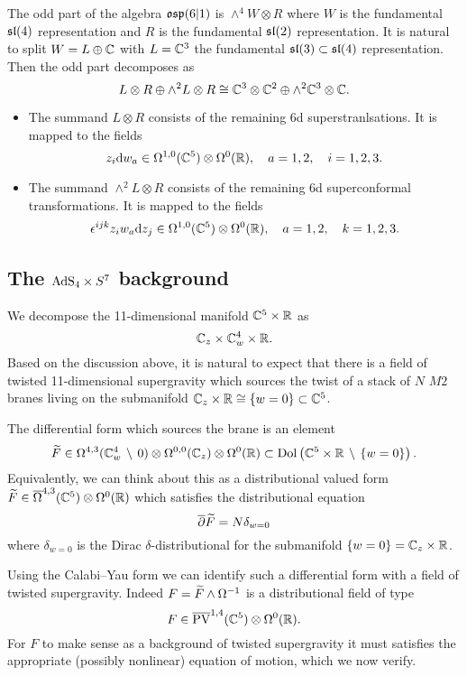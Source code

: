 \documentclass[11pt]{amsart}
\begin{document}
The odd part of the algebra $\mathfrak{osp}(6|1)$ is $\wedge^4 W \otimes R$ where $W$ is the fundamental $\mathfrak{sl}(4)$ representation and $R$ is the fundamental $\mathfrak{sl}(2)$ representation. 
It is natural to split $W = L \oplus \mathbb C$ with $L = \mathbb C^3$ the fundamental $\mathfrak{sl}(3) \subset \mathfrak{sl}(4)$ representation. 
Then the odd part decomposes as
\[
L \otimes R \oplus \wedge^2 L \otimes R \cong \mathbb C^3 \otimes \mathbb C^2 \oplus \wedge^2 \mathbb C^3 \otimes \mathbb C .
\]

\begin{itemize} 
\item The summand $L \otimes R$ consists of the remaining 6d superstranlsations. 
It is mapped to the fields 
\[
z_i {\rm d} w_a \in \Omega^{1,0}(\mathbb C^5) \otimes \Omega^0(\mathbb R) ,\quad a=1,2, \quad i =1,2,3.
\] 
\item The summand $\wedge^2 L \otimes R$ consists of the remaining 6d superconformal transformations. 
It is mapped to the fields
\[
\epsilon^{ijk} z_i w_a {\rm d} z_j \in \Omega^{1,0}(\mathbb C^5)\otimes \Omega^0(\mathbb R) , \quad a = 1,2, \quad k = 1,2,3. 
\]
\end{itemize}

\subsection{The ${\rm AdS}_4 \times S^7$ background}

\parsec[]

\parsec[]

We decompose the 11-dimensional manifold $\mathbb C^5 \times \mathbb R$ as
\[
\mathbb C_z \times \mathbb C^4_w \times \mathbb R .
\]
Based on the discussion above, it is natural to expect that there is a field of twisted 11-dimensional supergravity which sources the twist of a stack of $N$ $M2$ branes living on the submanifold $\mathbb C_z \times \mathbb R \cong \{w=0\}\subset \mathbb C^5$. 

The differential form which sources the brane is an element
\[
\widetilde{F} \in \Omega^{4,3} (\mathbb C^4_w \, \setminus \, 0) \otimes \Omega^{0,0} (\mathbb C_z) \otimes \Omega^{0} (\mathbb R) \subset \operatorname{Dol}\left(\mathbb C^5 \times \mathbb R \, \setminus \, \{w=0\}\right) .
\]
Equivalently, we can think about this as a distributional valued form $\widetilde{F} \in \overline{\Omega}^{4,3}(\mathbb C^5) \otimes \Omega^0 (\mathbb R)$ which satisfies the distributional equation
\[
\overline{\partial} \widetilde{F} = N \delta_{w=0} 
\]
where $\delta_{w=0}$ is the Dirac $\delta$-distributional for the submanifold $\{w=0\} = \mathbb C_z \times \mathbb R$. 

Using the Calabi--Yau form we can identify such a differential form with a field of twisted supergravity. 
Indeed $F = \widetilde{F} \wedge \Omega^{-1}$ is a distributional field of type
\[
F \in \overline{{\rm PV}}^{1,4}(\mathbb C^5) \otimes \Omega^0 (\mathbb R) .
\]
For $F$ to make sense as a background of twisted supergravity it must satisfies the appropriate (possibly nonlinear) equation of motion, which we now verify. 
\end{document}
